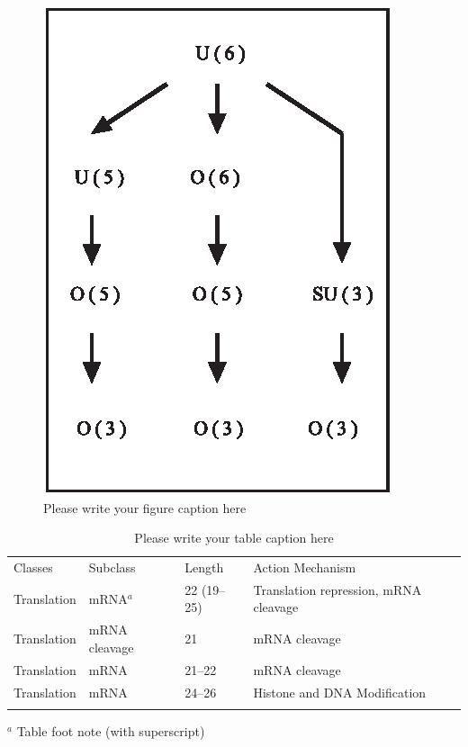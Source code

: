 %
\begin{figure}[t]
\sidecaption[t]
\includegraphics[scale=.65]{editorial/assets/figure}
%
%
\caption{Please write your figure caption here}
\label{global:appendix:fig:1}
\end{figure}

%
\begin{table}
\caption{Please write your table caption here}
\label{global:appendix:table:1}       %
%
%
\begin{tabular}{p{2cm}p{2.4cm}p{2cm}p{4.9cm}}
\hline\noalign{\smallskip}
Classes & Subclass & Length & Action Mechanism  \\
\noalign{\smallskip}\hline\noalign{\smallskip}
Translation & mRNA$^a$  & 22 (19--25) & Translation repression, mRNA cleavage\\
Translation & mRNA cleavage & 21 & mRNA cleavage\\
Translation & mRNA  & 21--22 & mRNA cleavage\\
Translation & mRNA  & 24--26 & Histone and DNA Modification\\
\noalign{\smallskip}\hline\noalign{\smallskip}
\end{tabular}
$^a$ Table foot note (with superscript)
\end{table}
%
